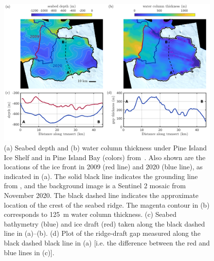 \documentclass[draft]{agujournal2019}
\begin{document}
\begin{figure}
    \centering
    \includegraphics[width = \textwidth]{../make_figures/plots/figure1.png}
    \caption{(a) Seabed depth and (b) water column thickness under Pine Island Ice Shelf and in Pine Island Bay (colors) from~. Also shown are the locations of the ice front in 2009 (red line) and 2020 (blue line), as indicated in (a).  The solid black line indicates the grounding line from , and the background image is a Sentinel 2 mosaic from November 2020. The black dashed line indicates the approximate location of the crest of the seabed ridge. The magenta contour in (b) corresponds to 125~m  water column thickness. (c) Seabed bathymetry (blue) and ice draft (red) taken along the black dashed line in (a)--(b). (d) Plot of the ridge-draft gap measured along the black dashed black line in (a) [i.e. the difference between the red and blue lines in (c)]. }
    \label{fig:figure1}
\end{figure}
\end{document}
